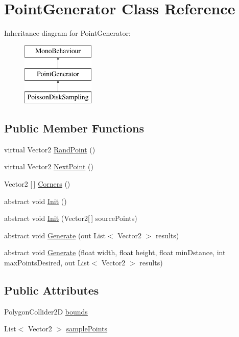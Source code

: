 \hypertarget{class_point_generator}{}\section{Point\+Generator Class Reference}
\label{class_point_generator}
Inheritance diagram for Point\+Generator\+:\begin{figure}[H]
\begin{center}
\leavevmode
\includegraphics[height=3.000000cm]{class_point_generator}
\end{center}
\end{figure}
\subsection*{Public Member Functions}
\begin{DoxyCompactItemize}
\item 
virtual Vector2 \mbox{\hyperlink{class_point_generator_a58500ea3c2c04ee376b6f85e53c65509}{Rand\+Point}} ()
\item 
virtual Vector2 \mbox{\hyperlink{class_point_generator_a91e70f9d4939dfb00755b46937e6d26b}{Next\+Point}} ()
\item 
Vector2 \mbox{[}$\,$\mbox{]} \mbox{\hyperlink{class_point_generator_a94c7b1d2e704fedde36309423cc0c609}{Corners}} ()
\item 
abstract void \mbox{\hyperlink{class_point_generator_ae254f890c9a38d044d77f981e0dfeb68}{Init}} ()
\item 
abstract void \mbox{\hyperlink{class_point_generator_a46241ac6f86e8a9cd190bbecba41f6d1}{Init}} (Vector2\mbox{[}$\,$\mbox{]} source\+Points)
\item 
abstract void \mbox{\hyperlink{class_point_generator_aa952bfb78a0b3d97db614f9f8d062747}{Generate}} (out List$<$ Vector2 $>$ results)
\item 
abstract void \mbox{\hyperlink{class_point_generator_a9552a67546e0f4a0d96cd300c656c94e}{Generate}} (float width, float height, float min\+Dstance, int max\+Points\+Desired, out List$<$ Vector2 $>$ results)
\end{DoxyCompactItemize}
\subsection*{Public Attributes}
\begin{DoxyCompactItemize}
\item 
Polygon\+Collider2D \mbox{\hyperlink{class_point_generator_ade370757db1179941702a6eb1944d6ea}{bounds}}
\item 
List$<$ Vector2 $>$ \mbox{\hyperlink{class_point_generator_a8ab671e3c028583108b4e90425a49b6b}{sample\+Points}}
\end{DoxyCompactItemize}


